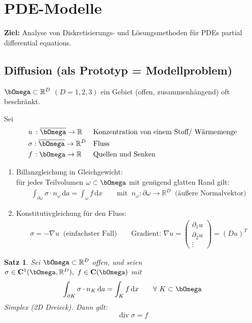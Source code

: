 \documentclass[12pt,twoside,reqno]{article}
\newcommand{\dx}{\,\mathrm{d}x}
\newcommand{\da}{\,\mathrm{d}a}
\renewcommand\div{\operatorname{div}}
\renewcommand{\Omega}{\bOmega}
\newcommand\bC{\mathbf{C}}
\newcommand{\R}{\mathbb{R}}
\theoremstyle{TheoWieners}
\newtheorem{Satz}[theow]{Satz}
\theoremstyle{break}
\theoremstyle{app}
\newtheorem{Spezielle Lösungen}[app]{Spezielle Lösungen}
\newtheorem{Spezielle Lösungen der Poisson-Gleichung}[app]{Spezielle Lösungen der Poisson-Gleichung}
\newtheorem{Kartesische Gitter in 2-d}[app]{Kartesische Gitter in 2-d}
\newtheorem{Diskretisierungen hoher Ordnung}[app]{Diskretisierungen hoher Ordnung}
\newtheorem{Zyklische Reduktion}[app]{Zyklische Reduktion}
\begin{document}


\section{PDE-Modelle}

\textbf{Ziel:} Analyse von Diskretisierungs- und Lösungsmethoden für PDEs partial differential equations.
\subsection{Diffusion (als Prototyp = Modellproblem)}
$\Omega \subset \R^D$ $(D=1,2,3 )$ ein Gebiet (offen, zusammenhängend) oft beschränkt.

Sei \begin{align*}
        &u \hspace{0.08cm} : \overline\Omega \rightarrow \R     && \text{Konzentration von einem Stoff/ Wärmemenge} \\
        &\sigma: \overline\Omega \rightarrow \R^D && \text{Fluss} \\
        &f\hspace{0.04cm}: \Omega \rightarrow \R 	    && \text{Quellen und Senken}
            \end{align*}

\begin{enumerate}[1)]
  \item
      Billanzgleichung in Gleichgewicht: \\ \qquad  \qquad für jedes Teilvolumen $\omega \subset \Omega$ mit genügend glatten Rand gilt:
\begin{eqnarray*}
      \int_{\partial \omega} \sigma \cdot n_{\omega} \da = \int_{\omega} f \dx  \qquad \text{mit  } \ n_{\omega} : \partial \omega \rightarrow \R^D \ \text{ (äu\ss ere Normalvektor)}
\end{eqnarray*}
      
  \item
     Konstitutivgleichung für den Fluss:
     \begin{eqnarray*}
    \sigma = - \nabla u \ \text{ (einfachster Fall)} \qquad
    \text{Gradient: } \nabla u =  \left(\begin{smallmatrix}
                \partial_1 u  \\
                \partial_2 u \\
                \vdots
              \end{smallmatrix}\right) = (Du)^T
\end{eqnarray*}
     \end{enumerate}
\begin{Satz}
    \label{satz:1.1}
    Sei $\Omega \subset \R^D$ offen, und seien $\sigma \in \bC^1 (\Omega, \R^D), \ f \in \bC(\Omega) $  mit $$  \int_{\partial K} \sigma \cdot n_{K} \da = \int_{K} f \dx  \qquad \forall \ K \subset \Omega$$ Simplex (2D Dreieck). Dann gilt:  $$\div \sigma =f$$
\end{Satz}
\end{document}

